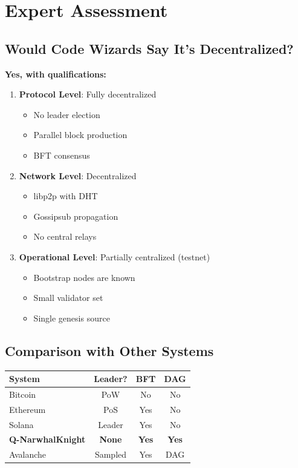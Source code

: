 \documentclass[a5paper,11pt]{article}
\begin{document}
\section{Expert Assessment}

\subsection{Would Code Wizards Say It's Decentralized?}

\textbf{Yes, with qualifications:}

\begin{enumerate}
    \item \textbf{Protocol Level}: Fully decentralized
    \begin{itemize}
        \item No leader election
        \item Parallel block production
        \item BFT consensus
    \end{itemize}

    \item \textbf{Network Level}: Decentralized
    \begin{itemize}
        \item libp2p with DHT
        \item Gossipsub propagation
        \item No central relays
    \end{itemize}

    \item \textbf{Operational Level}: Partially centralized (testnet)
    \begin{itemize}
        \item Bootstrap nodes are known
        \item Small validator set
        \item Single genesis source
    \end{itemize}
\end{enumerate}

\subsection{Comparison with Other Systems}

\begin{center}
\begin{tabular}{|l|c|c|c|}
\hline
\textbf{System} & \textbf{Leader?} & \textbf{BFT} & \textbf{DAG} \\
\hline
Bitcoin & PoW & No & No \\
Ethereum & PoS & Yes & No \\
Solana & Leader & Yes & No \\
\textbf{Q-NarwhalKnight} & \textbf{None} & \textbf{Yes} & \textbf{Yes} \\
Avalanche & Sampled & Yes & DAG \\
\hline
\end{tabular}
\end{center}
\end{document}
